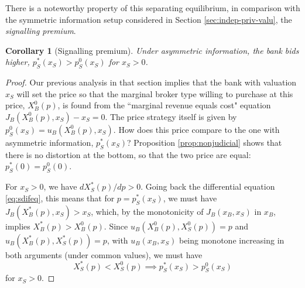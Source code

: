 \documentclass[11pt,twopage]{article}
\newtheorem{remark}{Remark}
{\bf}{\it}
\newtheorem{corollary}{Corollary}
{\bf}{\it}
\begin{document}

There is a noteworthy property of this separating equilibrium, in comparison with the symmetric information setup considered in Section \ref{sec:indep-priv-valu}, the \emph{signalling premium}. 
\begin{corollary}[Signalling premium]\label{cor:sp}
Under asymmetric information, the bank bids higher, $p_S^*(x_S) > p_S^0(x_S)$ for $x_S>0$.
\end{corollary}

\begin{proof} Our previous analysis in that section implies that the bank with valuation $x_S$ will set the price so that the marginal broker type willing to purchase at this price, $X_B^0(p)$, is found from the ``marginal revenue equals cost" equation $J_B(X_B^0(p),x_S)-x_S=0$. The price strategy itself is given by $p_S^0(x_S) = u_B(X_B^0(p),x_S)$. How does this price compare to the one with asymmetric information, $p_S^*(x_S)$? Proposition \ref{prop:nonjudicial} shows that there is no distortion at the bottom, so that the two price are equal: $p_S^*(0) = p_S^0(0)$.  

For $x_S>0$,  we have $d X_S^*(p)/dp>0$. Going back the differential equation \eqref{eq:sdifeq}, this means that for $p=p_S^*(x_S)$,  we must have $J_B(X_B^*(p),x_S)>x_S$, which, by the monotonicity of $J_B(x_B,x_S)$ in $x_B$, implies $ X_B^*(p)>X_B^0(p)$. Since $u_B(X_B^0(p),X_S^0(p)) = p$ and $u_B(X_B^*(p),X_S^*(p)) = p$, with $u_B(x_B,x_S)$ being monotone increasing in both arguments (under common values), we must have \[ X_S^*(p)<X_S^0(p) \implies p_S^*(x_S) > p_S^0(x_S)\] for $x_S>0$. \end{proof}
\end{document}
